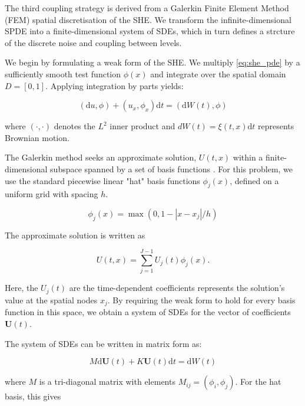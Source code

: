 The third coupling strategy is derived from a Galerkin Finite Element Method
(FEM) \cite{suli2025fe} spatial discretisation of the SHE. We transform 
the infinite-dimensional SPDE into a finite-dimensional system of SDEs, 
which in turn defines a strcture of the discrete noise and coupling between 
levels.

We begin by formulating a weak form of the SHE. We multiply \eqref{eq:she_pde} by 
a sufficiently smooth test function $\phi(x)$ and integrate over the spatial domain 
$D = [0,1]$. Applying integration by parts yields:

\begin{equation}\label{eq:she_differential_form}
    (\mathrm{d}u,\phi) + (u_x, \phi_x)\mathrm{d}t = (\mathrm{d}W(t), \phi)
\end{equation}

where $(\cdot, \cdot)$ denotes the $L^2$ inner product and  
$dW(t) = \xi(t,x)\mathrm{d}t$ represents Brownian
motion.

The Galerkin method seeks an approximate solution, $U(t,x)$ within a finite-dimensional
subspace spanned by a set of basis functions \cite{suli2025fe}. For this problem, 
we use the standard piecewise linear "hat" basis functions $\phi_j(x)$, defined on a 
uniform grid with spacing $h$. 

\begin{equation}
    \phi_j(x) = \max(0, 1 - |x-x_j|/ h)
\end{equation}

The approximate solution is written as

\begin{equation}
    U(t,x) = \sum_{j=1}^{J-1}U_j(t)\phi_j(x).
\end{equation}

Here, the $U_j(t)$ are the time-dependent coefficients represents the solution's value at
the spatial nodes $x_j$. By requiring the weak form to hold for every basis function 
in this space, we obtain a system of SDEs for the vector of coefficients $\mathbf{U}(t)$. 

The system of SDEs can be written in matrix form as:

\begin{equation}\label{eq:fe_sdes_system}
    M \mathrm{d}\mathbf{U}(t) + K \mathbf{U}(t)\mathrm{d}t = \mathrm{d}W(t)
\end{equation}

where $M$ is a tri-diagonal matrix with elements $M_{ij} = (\phi_i, \phi_j)$. 
For the hat basis, this gives

